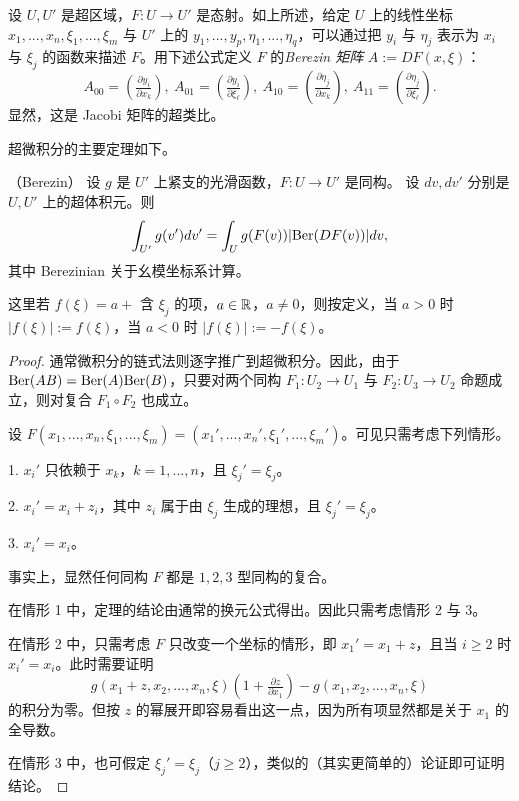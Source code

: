 设 $U,U'$ 是超区域，$F: U\to U'$ 是态射。如上所述，给定 $U$ 上的线性坐标 $x_1,...,x_n,\xi_1,...,\xi_m$
与 $U'$ 上的 $y_1,...,y_p,\eta_1,...,\eta_q$，可以通过把 $y_i$ 与 $\eta_j$ 表示为 $x_i$ 与
$\xi_j$ 的函数来描述 $F$。用下述公式定义 $F$ 的\emph{Berezin 矩阵} $A:=DF(x,\xi)$：
$$
A_{00}=(\tfrac{\partial y_i}{\partial x_k}),\
A_{01}=(\tfrac{\partial y_i}{\partial \xi_\ell}),\
A_{10}=(\tfrac{\partial \eta_j}{\partial x_k}),\
A_{11}=(\tfrac{\partial \eta_j}{\partial \xi_\ell}).
$$
显然，这是 Jacobi 矩阵的超类比。

超微积分的主要定理如下。

\begin{theorem}\label{Ber}（Berezin）
设 $g$ 是 $U'$ 上紧支的光滑函数，$F: U\to U'$ 是同构。
设 $dv,dv'$ 分别是 $U,U'$ 上的超体积元。则
$$
\int_{U'} g(v')dv'=\int_U g(F(v))|{\rm Ber}(DF(v))|dv,
$$
其中 Berezinian 关于幺模坐标系计算。
\end{theorem}

这里若
$f(\xi)=a+$ 含 $\xi_j$ 的项，$a\in \Bbb R$，$a\ne 0$，则按定义，当 $a>0$ 时 $|f(\xi)|:=f(\xi)$，当 $a<0$ 时 $|f(\xi)|:=-f(\xi)$。

\begin{proof} 通常微积分的链式法则逐字推广到超微积分。因此，由于
${\rm Ber}(AB)={\rm Ber}(A){\rm Ber
}(B)$，只要对两个同构 $F_1: U_2\to U_1$ 与 $F_2: U_3\to U_2$ 命题成立，则对复合 $F_1\circ F_2$ 也成立。

设
$F(x_1,...,x_n,\xi_1,...,\xi_m)=(x_1',...,x_n',\xi_1',...,\xi_m')$。可见只需考虑下列情形。

1. $x_i'$ 只依赖于 $x_k$，$k=1,...,n$，且 $\xi_j'=\xi_j$。

2. $x_i'=x_i+z_i$，其中 $z_i$ 属于由 $\xi_j$ 生成的理想，且 $\xi_j'=\xi_j$。

3. $x_i'=x_i$。

事实上，显然任何同构 $F$ 都是 $1,2,3$ 型同构的复合。

在情形 1 中，定理的结论由通常的换元公式得出。因此只需考虑情形 2 与 3。

在情形 2 中，只需考虑 $F$ 只改变一个坐标的情形，即
$x_1'=x_1+z$，且当 $i\ge 2$ 时 $x_i'=x_i$。此时需要证明
$$
g(x_1+z,x_2,...,x_n,\xi)(1+\tfrac{\partial z}{\partial
  x_1})-g(x_1,x_2,...,x_n,\xi)
$$
的积分为零。但按 $z$ 的幂展开即容易看出这一点，因为所有项显然都是关于 $x_1$ 的全导数。

在情形 3 中，也可假定 $\xi_j'=\xi_j$（$j\ge 2$），类似的（其实更简单的）论证即可证明结论。
\end{proof}


